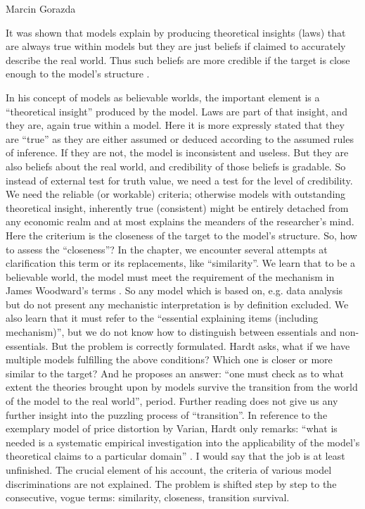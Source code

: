 \begin{recengenv}{Marcin Gorazda}
\begin{myquoterev}
It was shown that models explain by producing theoretical insights (laws) that are always true within models but they
are just beliefs if claimed to accurately describe the real world. Thus such beliefs are more credible if the target is
close enough to the model’s structure
\parencite[p.161]{hardt_economics_2017}.
\end{myquoterev}

\enlargethispage{-.5\baselineskip}

In his concept of models as believable worlds, the important element is a ``theoretical insight'' produced by the model.
Laws are part of that insight, and they are, again true within a model. Here it is more expressly stated that they are
``true'' as they are either assumed or deduced according to the assumed rules of inference. If they are not, the model is
inconsistent and useless. But they are also beliefs about the real world, and credibility of those beliefs is gradable.
So instead of external test for truth value, we need a test for the level of credibility. We need the reliable (or
workable) criteria; otherwise models with outstanding theoretical insight, inherently true (consistent) might be
entirely detached from any economic realm and at most explains the meanders of the researcher’s mind. Here the
criterium is the closeness of the target to the model’s structure. So, how to assess the ``closeness''? In the chapter,
we encounter several attempts at clarification this term or its replacements, like ``similarity''. We learn that to be a
believable world, the model must meet the requirement of the mechanism in James Woodward’s terms
\parencite{woodward_what_2002}.
So any model which is based on, e.g. data analysis but do not present any
mechanistic interpretation is by definition excluded. We also learn that it must refer to the ``essential explaining
items (including mechanism)'', but we do not know how to distinguish between essentials and non-essentials. But the
problem is correctly formulated. Hardt asks, what if we have multiple models fulfilling the above conditions? Which one
is closer or more similar to the target? And he proposes an answer: ``\mydots one must check as to what extent the theories
brought upon by models survive the transition from the world of the model to the real world'', period. Further reading
does not give us any further insight into the puzzling process of ``transition''. In reference to the exemplary model of
price distortion by Varian, Hardt only remarks: ``\mydots what is needed is a systematic empirical investigation into the
applicability of the model’s theoretical claims to a particular domain''
\parencite[p.154]{hardt_economics_2017}.
I would say that the job is at least unfinished. The crucial element of his account, the criteria of various model
discriminations are not explained. The problem is shifted step by step to the consecutive, vogue terms: similarity,
closeness, transition survival. 


\end{recengenv}

